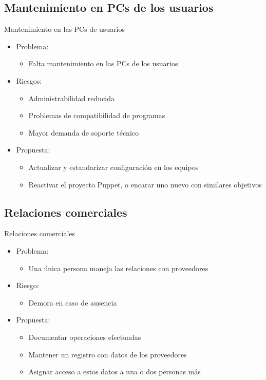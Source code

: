\documentclass[spanish]{beamer}
\begin{document}
\subsection{Mantenimiento en PCs de los usuarios}
\begin{frame}{Mantenimiento en las PCs de usuarios}
  \begin{itemize}
  \item Problema:
    \begin{itemize}
    \item Falta mantenimiento en las PCs de los usuarios
    \end{itemize}
  \item Riesgos:
    \begin{itemize}
    \item Administrabilidad reducida
    \item Problemas de compatibilidad de programas
    \item Mayor demanda de soporte técnico
    \end{itemize}
  \item Propuesta:
    \begin{itemize}
    \item Actualizar y estandarizar configuración en los equipos
    \item Reactivar el proyecto Puppet, o encarar uno nuevo con
      similares objetivos
    \end{itemize}
  \end{itemize}
\end{frame}


\subsection{Relaciones comerciales}
\begin{frame}{Relaciones comerciales}
  \begin{itemize}
  \item Problema:
    \begin{itemize}
    \item Una única persona maneja las relaciones con proveedores
    \end{itemize}
  \item Riesgo:
    \begin{itemize}
    \item Demora en caso de ausencia
    \end{itemize}  
  \item Propuesta:
    \begin{itemize}
    \item Documentar operaciones efectuadas
    \item Mantener un registro con datos de los proveedores
    \item Asignar acceso a estos datos a una o dos personas más
    \end{itemize}
  \end{itemize}
\end{frame}
\end{document}
